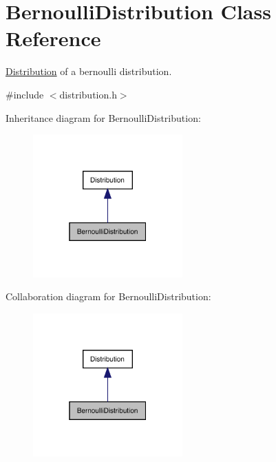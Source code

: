 \hypertarget{class_bernoulli_distribution}{}\section{Bernoulli\+Distribution Class Reference}
\label{class_bernoulli_distribution}


\mbox{\hyperlink{class_distribution}{Distribution}} of a bernoulli distribution.  




{\ttfamily \#include $<$distribution.\+h$>$}



Inheritance diagram for Bernoulli\+Distribution\+:
\nopagebreak
\begin{figure}[H]
\begin{center}
\leavevmode
\includegraphics[width=163pt]{class_bernoulli_distribution__inherit__graph}
\end{center}
\end{figure}


Collaboration diagram for Bernoulli\+Distribution\+:
\nopagebreak
\begin{figure}[H]
\begin{center}
\leavevmode
\includegraphics[width=163pt]{class_bernoulli_distribution__coll__graph}
\end{center}
\end{figure}
